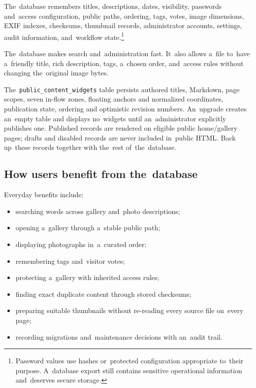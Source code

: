 \documentclass[11pt,a4paper]{article}
\begin{document}
The~database remembers titles, descriptions, dates, visibility, passwords
and~access configuration, public paths, ordering, tags, votes, image dimensions,
EXIF indexes, checksums, thumbnail records, administrator accounts, settings,
audit information, and~workflow state.\footnote{Password values use hashes
or~protected configuration appropriate to~their purpose. A~database export still
contains sensitive operational information and~deserves secure storage.}

The~database makes search and~administration fast. It~also allows a~file to~have
a~friendly title, rich description, tags, a~chosen order, and~access rules
without changing the~original image bytes.

The~\texttt{public\_content\_widgets} table persists authored titles, Markdown,
page scopes, seven in-flow zones, floating anchors and normalized coordinates,
publication state, ordering and optimistic revision numbers. An~upgrade creates
an~empty table and displays no~widgets until an~administrator explicitly
publishes one. Published records are rendered on eligible public home/gallery
pages; drafts and disabled records are never included in~public HTML. Back
up~these records together with the~rest of~the~database.

\subsection{How users benefit from the~database}

Everyday benefits include:

\begin{itemize}
  \item searching words across gallery and~photo descriptions;
  \item opening a~gallery through a~stable public path;
  \item displaying photographs in~a~curated order;
  \item remembering tags and~visitor votes;
  \item protecting a~gallery with inherited access rules;
  \item finding exact duplicate content through stored checksums;
  \item preparing suitable thumbnails without re-reading every source file
  on~every page;
  \item recording migrations and~maintenance decisions with an~audit trail.
\end{itemize}
\end{document}
